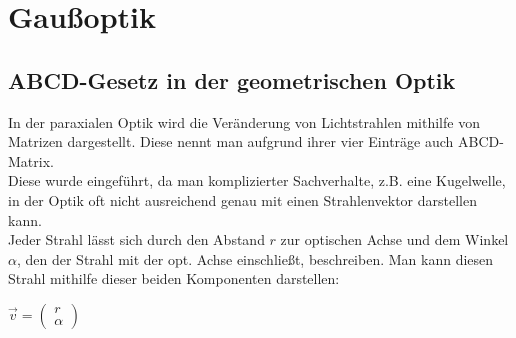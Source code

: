 \section{Gaußoptik}
\subsection{ABCD-Gesetz in der geometrischen Optik}
In der paraxialen Optik wird die Veränderung von Lichtstrahlen mithilfe von Matrizen dargestellt. Diese nennt 
man aufgrund ihrer vier Einträge auch ABCD-Matrix.\\
Diese wurde eingeführt, da man komplizierter Sachverhalte, z.B. eine Kugelwelle, in der Optik oft nicht ausreichend genau mit einen
Strahlenvektor darstellen kann. \\
Jeder Strahl lässt sich durch den Abstand $r$ zur optischen Achse und dem Winkel $\alpha$, den der Strahl 
mit der opt. Achse einschließt, beschreiben.
Man kann diesen Strahl mithilfe dieser beiden Komponenten darstellen:

$\vec{v}= \left(\begin{array}{c} r \\ \alpha \end{array}\right)$

